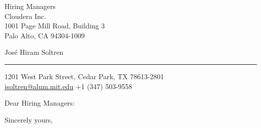 \documentclass{letter} %
\begin{document}
\signature{Jos\'e Hiram Soltren}           %
\longindentation=0pt                       %
\let\raggedleft\raggedright                %
 
 
\begin{letter}{Hiring Managers\\
Cloudera Inc.\\
1001 Page Mill Road, Building 3\\ 
Palo Alto, CA 94304-1009}
    
\begin{flushleft}
{\LARGE\sffamily Jos\'e Hiram Soltren}
\end{flushleft}
\medskip\hrule height 1pt
\begin{flushright}
\hfill 1201 West Park Street, Cedar Park, TX 78613-2801 \\
\hfill {}\href{mailto:jsoltren@alum.mit.edu}{jsoltren@alum.mit.edu}
         +1 (347) 503-9558
\end{flushright} 
\vfill %

 
\opening{Dear Hiring Managers:} 
 
 
 
 
\closing{Sincerely yours,} 
 

 

\end{letter}
 
\end{document}
